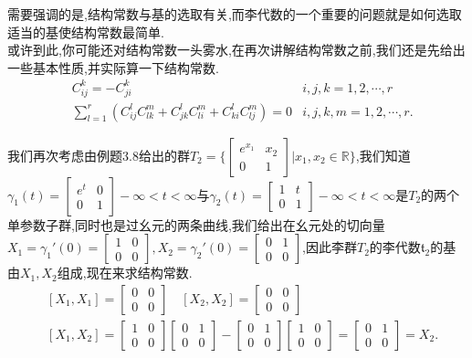 需要强调的是,结构常数与基的选取有关,而李代数的一个重要的问题就是如何选取适当的基使结构常数最简单.\\
或许到此,你可能还对结构常数一头雾水,在再次讲解结构常数之前,我们还是先给出一些基本性质,并实际算一下结构常数.
\begin{equation}
	\begin{aligned}
		&C_{ij}^{ k}=-C_{ji}^{ k}&i,j,k=1,2,\cdots,r\\
		&\sum_{l=1}^{r}\left(C_{ij}^{l}C_{lk}^{m}+C_{jk}^{l}C_{li}^{m}+C_{ki}^{l}C_{lj}^{m}\right)=0&i,j,k,m=1,2,\cdots,r.\end{aligned}
\end{equation}
\begin{example}
	我们再次考虑由例题3.8给出的群$T_2=\Big\{\begin{bmatrix}e^{x_1}&x_2\\0&1\end{bmatrix}\Big|x_1,x_2\in\mathbb{R}\Big\}$,我们知道$\gamma_1(t)=\begin{bmatrix}e^t&0\\0&1\end{bmatrix} -\infty<t<\infty $与$\gamma_2(t)=\begin{bmatrix}1&t\\0&1\end{bmatrix} -\infty<t<\infty $是$T_2$的两个单参数子群,同时也是过幺元的两条曲线,我们给出在幺元处的切向量$X_1=\gamma_1'(0)=\begin{bmatrix}1&0\\0&0\end{bmatrix},X_2=\gamma_2'(0)=\begin{bmatrix}0&1\\0&0\end{bmatrix}$,因此李群$T_2$的李代数$\mathfrak{t}_2$的基由$X_1,X_2$组成,现在来求结构常数.
	\begin{equation}
		\begin{aligned}&[X_1,X_1]=\begin{bmatrix}0&0\\0&0\end{bmatrix}\quad[X_2,X_2]=\begin{bmatrix}0&0\\0&0\end{bmatrix}\\&[X_1,X_2]=\begin{bmatrix}1&0\\0&0\end{bmatrix}\begin{bmatrix}0&1\\0&0\end{bmatrix}-\begin{bmatrix}0&1\\0&0\end{bmatrix}\begin{bmatrix}1&0\\0&0\end{bmatrix}=\begin{bmatrix}0&1\\0&0\end{bmatrix}=X_2.\end{aligned}

\end{equation}
\end{example}
